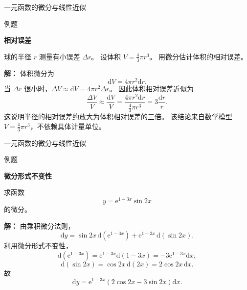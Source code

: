\documentclass[aspectratio=169,10pt,fontset=fandol]{ctexbeamer}
\newcommand{\dd}{\mathrm{d}}
\newcommand{\ee}{\mathrm{e}}
\begin{document}
\begin{frame}[t,fragile]{一元函数的微分与线性近似}
\normalsize
\begin{block}{例题}
{\normalsize
\textbf{相对误差}\par

球的半径 $r$ 测量有小误差 $\Delta r$。 设体积 $V=\frac43\pi r^3$。 用微分估计体积的相对误差。

}
\end{block}
\pause
{\normalsize
\textbf{解：}
体积微分为
\[
\dd V=4\pi r^2\dd r.
\]
当 $\Delta r$ 很小时，$\Delta V\approx \dd V=4\pi r^2\Delta r$。 因此体积相对误差近似为
\[
\frac{\Delta V}{V}\approx
\frac{\dd V}{V}
=\frac{4\pi r^2\dd r}{\frac43\pi r^3}
=3\frac{\dd r}{r}.
\]
这说明半径的相对误差约放大为体积相对误差的三倍。 该结论来自数学模型 $V=\frac43\pi r^3$，不依赖具体计量单位。

}
\end{frame}
\begin{frame}[t,fragile]{一元函数的微分与线性近似}
\normalsize
\begin{block}{例题}
{\normalsize
\textbf{微分形式不变性}\par

求函数
\[
y=\ee^{1-3x}\sin2x
\]
的微分。

}
\end{block}
\pause
{\normalsize
\textbf{解：}
由乘积微分法则，
\[
\dd y=\sin2x\,\dd(\ee^{1-3x})+\ee^{1-3x}\,\dd(\sin2x).
\]
利用微分形式不变性，
\[
\dd(\ee^{1-3x})=\ee^{1-3x}\dd(1-3x)=-3\ee^{1-3x}\dd x,
\]
\[
\dd(\sin2x)=\cos2x\,\dd(2x)=2\cos2x\,\dd x.
\]
故
\[
\dd y=\ee^{1-3x}(2\cos2x-3\sin2x)\dd x.
\]

}
\end{frame}
\end{document}

